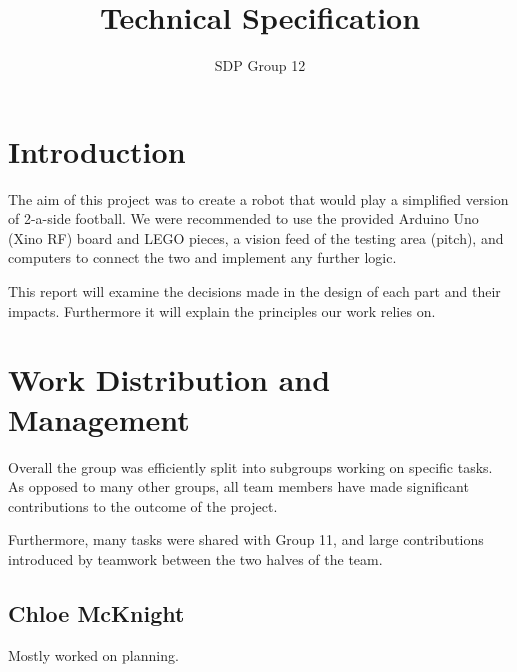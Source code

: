 \documentclass[12pt,a4paper,titlepage]{article}
\author{SDP Group 12}
\title{Technical Specification}
\begin{document}
\maketitle




\section{Introduction}

The aim of this project was to create a robot that would play a simplified version of 2-a-side football. We were recommended to use the provided Arduino Uno (Xino RF) board and LEGO pieces, a vision feed of the testing area (pitch), and computers to connect the two and implement any further logic.

This report will examine the decisions made in the design of each part and their impacts. Furthermore it will explain the principles our work relies on.


\section{Work Distribution and Management}
Overall the group was efficiently split into subgroups working on specific tasks. As opposed to many other groups, all team members have made significant contributions to the outcome of the project.

Furthermore, many tasks were shared with Group 11, and large contributions introduced by teamwork between the two halves of the team.


\subsection{Chloe McKnight}
Mostly worked on planning.
\end{document}
